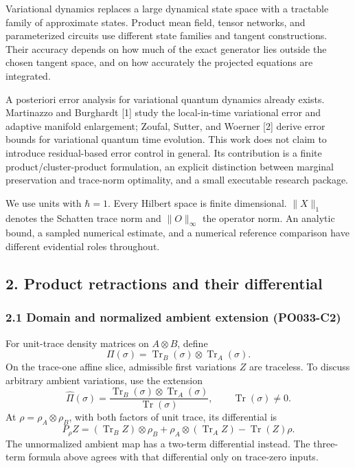 \documentclass[
]{article}
\begin{document}
Variational dynamics replaces a large dynamical state space with a tractable family of approximate states. Product mean field, tensor networks, and parameterized circuits use different state families and tangent constructions. Their accuracy depends on how much of the exact generator lies outside the chosen tangent space, and on how accurately the projected equations are integrated.

A posteriori error analysis for variational quantum dynamics already exists. Martinazzo and Burghardt {[}1{]} study the local-in-time variational error and adaptive manifold enlargement; Zoufal, Sutter, and Woerner {[}2{]} derive error bounds for variational quantum time evolution. This work does not claim to introduce residual-based error control in general. Its contribution is a finite product/cluster-product formulation, an explicit distinction between marginal preservation and trace-norm optimality, and a small executable research package.

We use units with \(\hbar=1\). Every Hilbert space is finite dimensional. \(\|X\|_1\) denotes the Schatten trace norm and \(\|O\|_\infty\) the operator norm. An analytic bound, a sampled numerical estimate, and a numerical reference comparison have different evidential roles throughout.

\subsection{2. Product retractions and their differential}\label{product-retractions-and-their-differential}

\subsubsection{2.1 Domain and normalized ambient extension (PO033-C2)}\label{domain-and-normalized-ambient-extension-po033-c2}

For unit-trace density matrices on \(A\otimes B\), define
\[
\Pi(\sigma)=\operatorname{Tr}_B(\sigma)\otimes\operatorname{Tr}_A(\sigma).
\]
On the trace-one affine slice, admissible first variations \(Z\) are traceless. To discuss arbitrary ambient variations, use the extension
\[
\widehat\Pi(\sigma)=
\frac{\operatorname{Tr}_B(\sigma)\otimes\operatorname{Tr}_A(\sigma)}
{\operatorname{Tr}(\sigma)},\qquad \operatorname{Tr}(\sigma)\ne0.
\]
At \(\rho=\rho_A\otimes\rho_B\), with both factors of unit trace, its differential is
\[
P_\rho Z=(\operatorname{Tr}_B Z)\otimes\rho_B
+\rho_A\otimes(\operatorname{Tr}_A Z)
-\operatorname{Tr}(Z)\rho.
\]
The unnormalized ambient map has a two-term differential instead. The three-term formula above agrees with that differential only on trace-zero inputs.
\end{document}

